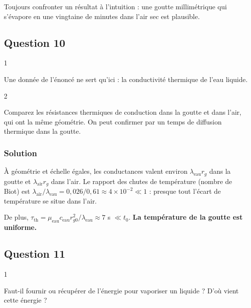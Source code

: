 \documentclass[11pt,a4paper]{article}
\begin{document}
\begin{methode}

Toujours confronter un résultat à l'intuition : une goutte millimétrique qui s'évapore en une vingtaine de minutes dans l'air sec est plausible.

\end{methode}

\hypertarget{question-10}{%
\subsection{Question 10}\label{question-10}}

\begin{indication}{1}

Une donnée de l'énoncé ne sert qu'ici : la conductivité thermique de l'eau liquide.

\end{indication}

\begin{indication}{2}

Comparez les résistances thermiques de conduction dans la goutte et dans l'air, qui ont la même géométrie. On peut confirmer par un temps de diffusion thermique dans la goutte.

\end{indication}

\hypertarget{solution-9}{%
\subsubsection{Solution}\label{solution-9}}

À géométrie et échelle égales, les conductances valent environ \(\lambda_{\text{eau}}r_g\) dans la goutte et \(\lambda_{\text{air}}r_g\) dans l'air. Le rapport des chutes de température (nombre de Biot) est \(\lambda_{\text{air}}/\lambda_{\text{eau}}=0{,}026/0{,}61\approx4\times10^{-2}\ll1\) : presque tout l'écart de température se situe dans l'air.

De plus, \(\tau_{\text{th}}=\mu_{\text{eau}}c_{\text{eau}}r_{g0}^2/\lambda_{\text{eau}}\approx7\) s \(\ll t_0\). \textbf{La température de la goutte est uniforme.}

\hypertarget{question-11}{%
\subsection{Question 11}\label{question-11}}

\begin{indication}{1}

Faut-il fournir ou récupérer de l'énergie pour vaporiser un liquide ? D'où vient cette énergie ?

\end{indication}
\end{document}
